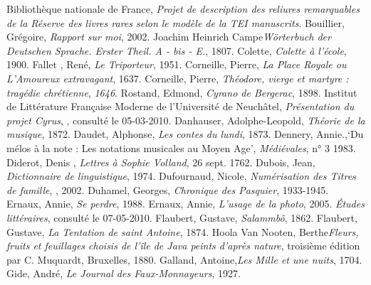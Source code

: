 \begin{bibitemlist}{1}
 Bibliothèque nationale de France, \textit{Projet de description des reliures remarquables de la Réserve des livres rares selon le modèle de la TEI manuscrits}.
 Bouillier, Grégoire, \textit{Rapport sur moi}, 2002.
 Joachim Heinrich Campe\textit{Wörterbuch der Deutschen Sprache. Erster Theil. A - bis - E.}, 1807.
 Colette, \textit{Colette à l'école}, 1900.
 Fallet , René, \textit{Le Triporteur}, 1951.
 Corneille, Pierre, \textit{La Place Royale ou L'Amoureux extravagant}, 1637.
 Corneille, Pierre, \textit{Théodore, vierge et martyre : tragédie chrétienne}, \textit{1646}.
 Rostand, Edmond, \textit{Cyrano de Bergerac}, 1898.
 Institut de Littérature Française Moderne de l’Université de Neuchâtel, \textit{Présentation du projet Cyrus}, , consulté le 05-03-2010.
 Danhauser, Adolphe-Leopold, \textit{Théorie de la musique}, 1872.
 Daudet, Alphonse, \textit{Les contes du lundi}, 1873.
 Dennery, Annie.,‘Du mélos à la note : Les notations musicales au Moyen Age’, \textit{Médiévales}, n° 3 1983.
 Diderot, Denis , \textit{Lettres à Sophie Volland}, 26 sept. 1762.
 Dubois, Jean, \textit{Dictionnaire de linguistique}, 1974.
 Dufournaud, Nicole, \textit{Numérisation des Titres de famille}, , 2002.
 Duhamel, Georges, \textit{Chronique des Pasquier}, 1933-1945.
 Ernaux, Annie, \textit{Se perdre}, 1988.
 Ernaux, Annie, \textit{L'usage de la photo}, 2005.
 \textit{Études littéraires}, consulté le 07-05-2010.
 Flaubert, Gustave, \textit{Salammbô}, 1862.
 Flaubert, Gustave, \textit{La Tentation de saint Antoine}, 1874.
 Hoola Van Nooten, Berthe\textit{Fleurs, fruits et feuillages choisis de l'île de Java peints d'après nature}, troisième édition par C. Muquardt, Bruxelles, 1880.
 Galland, Antoine,\textit{Les Mille et une nuits}, 1704.
 Gide, André, \textit{Le Journal des Faux-Monnayeurs}, 1927.

\end{bibitemlist}
